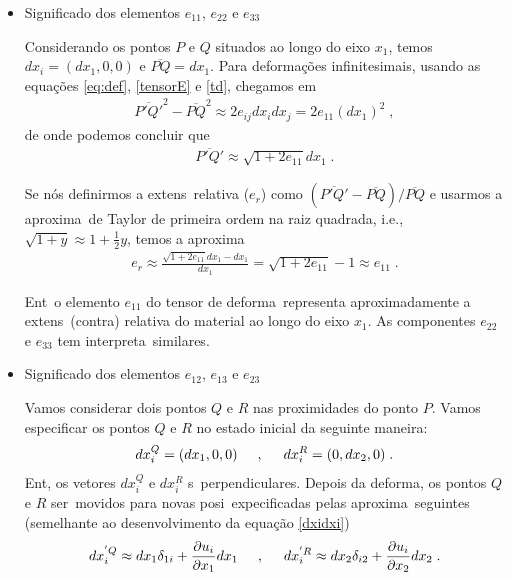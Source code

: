 \begin{itemize}
\item Significado  dos elementos $e_{11}$, $e_{22}$ e
$e_{33}$

Considerando os pontos $P$ e $Q$ situados ao longo do eixo
$x_1$, temos $dx_i = (dx_1,0,0)$ e $\overline{PQ} = dx_1$.
Para deforma\c{c}\~oes infinitesimais, usando as equa\c{c}\~oes 
\ref{eq:def}, \ref{tensorE} e \ref{td}, chegamos em
\begin{eqnarray}
\overline{P'Q'}^2 -\overline{PQ}^2 \approx 2e_{ij}dx_idx_j
= 2e_{11}(dx_1)^2 \; ,
\end{eqnarray}
de onde podemos concluir que
\begin{eqnarray}
\overline{P'Q'} \approx \sqrt{1 + 2 e_{11}} dx_1 \; .
\end{eqnarray}

Se n\'os definirmos a extens\ao\ relativa ($e_r$) como
$(\overline{P'Q'}-\overline{PQ}) / \overline{PQ}$ e usarmos
a aproxima\cao\ de Taylor de primeira ordem na raiz quadrada, i.e.,
$\sqrt{1+y}\approx 1 + \frac{1}{2}y$, temos a aproxima\cao
\begin{eqnarray}
e_r \approx \frac{\sqrt{1+2 e_{11}} dx_1-dx_1}{dx_1}
= \sqrt{1+2 e_{11}} - 1 \approx e_{11} \; .
\end{eqnarray}

Ent\ao\ o elemento $e_{11}$ do tensor de deforma\cao\
representa aproximadamente a extens\ao\ (contra\cao)
relativa do material ao longo do eixo $x_1$. As
componentes $e_{22}$ e $e_{33}$ tem interpreta\coes\
similares.

\item Significado  dos elementos $e_{12}$, $e_{13}$ e
$e_{23}$

Vamos considerar dois pontos $Q$ e $R$ nas proximidades
do ponto $P$. Vamos especificar os pontos $Q$ e $R$ no
estado inicial da seguinte maneira:
\begin{eqnarray}
dx_i^{Q}=(dx_1,0,0) \hspace{0.5cm}, \hspace{0.5cm} dx_i^{R}
=(0,dx_2,0) \; .
\end{eqnarray}
Ent\ao, os vetores $dx_i^Q$ e $dx_i^R$ s\ao\ perpendiculares.
Depois da deforma\cao, os pontos $Q$ e $R$ ser\ao\ movidos
para novas posi\coes\ expecificadas pelas aproxima\coes\
seguintes (semelhante ao desenvolvimento da equa\c{c}\~ao \ref{dxidxi})
\begin{eqnarray}
dx_i^{'Q} \approx dx_1 \delta_{1i} + \frac{\partial u_i}
{\partial x_1} dx_1
\hspace{0.5cm}, \hspace{0.5cm}
dx_i^{'R} \approx dx_2 \delta_{i2} + \frac{\partial u_i}
{\partial x_2} dx_2 \; .
\end{eqnarray}


\end{itemize}
